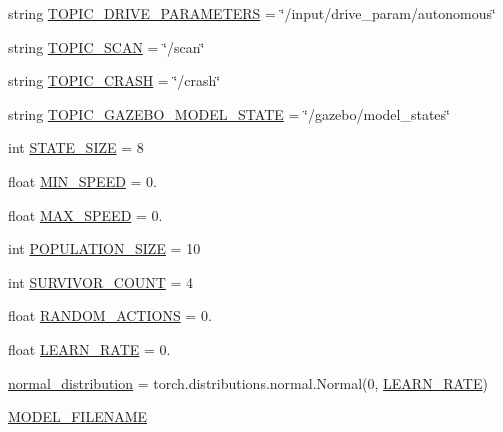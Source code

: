 \begin{DoxyCompactItemize}
\item 
string \hyperlink{namespaceneural__car__driver_a161258e51d15f04d9063e42ef5c7be6a}{T\+O\+P\+I\+C\+\_\+\+D\+R\+I\+V\+E\+\_\+\+P\+A\+R\+A\+M\+E\+T\+E\+RS} = \char`\"{}/input/drive\+\_\+param/autonomous\char`\"{}
\item 
string \hyperlink{namespaceneural__car__driver_aa0a0413ce25fecb4d35f07c7fea06a8c}{T\+O\+P\+I\+C\+\_\+\+S\+C\+AN} = \char`\"{}/scan\char`\"{}
\item 
string \hyperlink{namespaceneural__car__driver_a6f5373020b03b73072779ffc5d44482d}{T\+O\+P\+I\+C\+\_\+\+C\+R\+A\+SH} = \char`\"{}/crash\char`\"{}
\item 
string \hyperlink{namespaceneural__car__driver_a8e8319dbdbdbc3c32c3184c82f9c3f80}{T\+O\+P\+I\+C\+\_\+\+G\+A\+Z\+E\+B\+O\+\_\+\+M\+O\+D\+E\+L\+\_\+\+S\+T\+A\+TE} = \char`\"{}/gazebo/model\+\_\+states\char`\"{}
\item 
int \hyperlink{namespaceneural__car__driver_ac9d3bc133f799be5e8c5c55884d10a8d}{S\+T\+A\+T\+E\+\_\+\+S\+I\+ZE} = 8
\item 
float \hyperlink{namespaceneural__car__driver_a5292cc13090a4c357e023f5732a8a18a}{M\+I\+N\+\_\+\+S\+P\+E\+ED} = 0.
\item 
float \hyperlink{namespaceneural__car__driver_af2fef2c19127bf0b4e990d28542c7b6f}{M\+A\+X\+\_\+\+S\+P\+E\+ED} = 0.
\item 
int \hyperlink{namespaceneural__car__driver_aaf8ade0766a9fd72a41c1029d04d6d5e}{P\+O\+P\+U\+L\+A\+T\+I\+O\+N\+\_\+\+S\+I\+ZE} = 10
\item 
int \hyperlink{namespaceneural__car__driver_ad40064153991947271d4a197983593fa}{S\+U\+R\+V\+I\+V\+O\+R\+\_\+\+C\+O\+U\+NT} = 4
\item 
float \hyperlink{namespaceneural__car__driver_afb68376c882e8c25519918f9d079e6c0}{R\+A\+N\+D\+O\+M\+\_\+\+A\+C\+T\+I\+O\+NS} = 0.
\item 
float \hyperlink{namespaceneural__car__driver_a3873d214234a7685f0003bdedb09a3b5}{L\+E\+A\+R\+N\+\_\+\+R\+A\+TE} = 0.
\item 
\hyperlink{namespaceneural__car__driver_a953d05d55cd2232a21159009976855f3}{normal\+\_\+distribution} = torch.\+distributions.\+normal.\+Normal(0, \hyperlink{namespaceneural__car__driver_a3873d214234a7685f0003bdedb09a3b5}{L\+E\+A\+R\+N\+\_\+\+R\+A\+TE})
\item 
\hyperlink{namespaceneural__car__driver_a067bf25e6557471566d69b477b79ade5}{M\+O\+D\+E\+L\+\_\+\+F\+I\+L\+E\+N\+A\+ME}

\end{DoxyCompactItemize}
